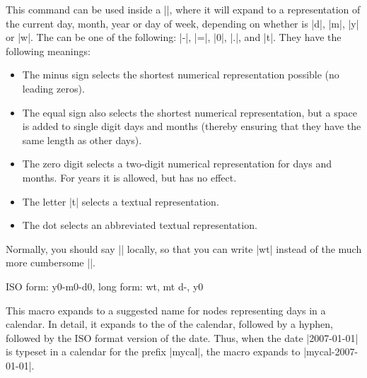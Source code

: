 \begin{command}{\pgfcalendarshorthand{}}
  \label{pgfcalendarshorthand}
  This command can be used inside a |\pgfcalendar|, where it will
  expand to a representation of the current day, month, year or day of
  week, depending on whether  is |d|, |m|, |y| or |w|. The
   can be one of the following: |-|, |=|, |0|,
  |.|, and |t|. They have the following meanings:
  \begin{itemize}
  \item The minus sign selects the shortest numerical representation
    possible (no leading zeros).
  \item The equal sign also selects the shortest numerical
    representation, but a space is added to single digit days and
    months (thereby ensuring that they have the same length as other
    days).
  \item The zero digit selects a two-digit numerical representation
    for days and months. For years it is allowed, but has no effect.
  \item The letter |t| selects a textual representation.
  \item The dot selects an abbreviated textual representation.
  \end{itemize}
  Normally, you should say |\let\%=\pgfcalendarshorthand| locally, so
  that you can write |\%wt| instead of the much more cumbersome
  ||. 

\begin{codeexample}
\let\%=\pgfcalendarshorthand
{}
{ ISO form: \%y0-\%m0-\%d0, long form: \%wt, \%mt \%d-, \%y0}    
\end{codeexample}
\end{command}


\begin{command}{\pgfcalendarsuggestedname}
  This macro expands to a suggested name for nodes representing days
  in a calendar. In detail, it expands to the  of the
  calendar, followed by a hyphen, followed by the ISO format version
  of the date. Thus, when the date |2007-01-01| is typeset in a
  calendar for the prefix |mycal|, the macro expands to
  |mycal-2007-01-01|. 
\end{command}


